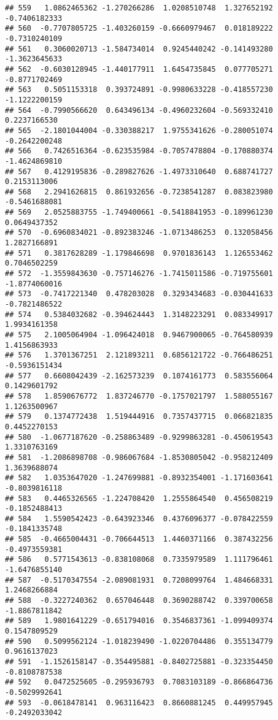 \documentclass[
]{article}
\begin{document}
\begin{verbatim}
## 559   1.0862465362 -1.270266286  1.0208510748  1.327652192 -0.7406182333
## 560  -0.7707805725 -1.403260159 -0.6660979467  0.018189222 -0.7310240109
## 561   0.3060020713 -1.584734014  0.9245440242 -0.141493280 -1.3623645633
## 562  -0.6030128945 -1.440177911  1.6454735845  0.077705271 -0.8771702469
## 563   0.5051153318  0.393724891 -0.9980633228 -0.418557230 -1.1222200159
## 564  -0.7990566620  0.643496134 -0.4960232604 -0.569332410  0.2237166530
## 565  -2.1801044004 -0.330388217  1.9755341626 -0.280051074 -0.2642200248
## 566   0.7426516364 -0.623535984 -0.7057478804 -0.170880374 -1.4624869810
## 567   0.4129195836 -0.289827626 -1.4973310640  0.688741727  0.2153113006
## 568   2.2941626815  0.861932656 -0.7238541287  0.083823980 -0.5461688081
## 569   2.0525883755 -1.749400661 -0.5418841953 -0.189961230  0.0649437352
## 570  -0.6960834021 -0.892383246 -1.0713486253  0.132058456  1.2827166891
## 571   0.3817628289 -1.179846698  0.9701836143  1.126553462  0.7046502259
## 572  -1.3559843630 -0.757146276 -1.7415011586 -0.719755601 -1.8774060016
## 573  -0.7417221340  0.478203028  0.3293434683 -0.030441633 -0.7821486522
## 574   0.5384032682 -0.394624443  1.3148223291  0.083349917  1.9934161358
## 575   2.1005064904 -1.096424018  0.9467900065 -0.764580939  1.4156863933
## 576   1.3701367251  2.121893211  0.6856121722 -0.766486251 -0.5936151434
## 577   0.6608042439 -2.162573239  0.1074161773  0.583556064  0.1429601792
## 578   1.8590676772  1.837246770 -0.1757021797  1.588055167  1.1263500967
## 579   0.1374772438  1.519444916  0.7357437715  0.066821835  0.4452270153
## 580  -1.0677187620 -0.258863489 -0.9299863281 -0.450619543  1.3310763169
## 581  -1.2086898708 -0.986067684 -1.8530805042 -0.958212409  1.3639688074
## 582   1.0353647020 -1.247699881 -0.8932354001 -1.171603641 -0.8039816118
## 583   0.4465326565 -1.224708420  1.2555864540  0.456508219 -0.1852488413
## 584   1.5590542423 -0.643923346  0.4376096377 -0.078422559 -0.1841335748
## 585  -0.4665004431 -0.706644513  1.4460371166  0.387432256 -0.4973559381
## 586   0.5771543613 -0.838108068  0.7335979589  1.111796461 -1.6476855140
## 587  -0.5170347554 -2.089081931  0.7208099764  1.484668331  1.2468266884
## 588  -0.3227240362  0.657046448  0.3690288742  0.339700658 -1.8867811842
## 589   1.9801641229 -0.651794016  0.3546837361 -1.099409374  0.1547809529
## 590   0.5099562124 -1.018239490 -1.0220704486  0.355134779  0.9616137023
## 591  -1.1526158147 -0.354495881 -0.8402725881 -0.323354450 -0.8108787538
## 592   0.0472525605 -0.295936793  0.7083103189 -0.866864736 -0.5029992641
## 593  -0.0618478141  0.963116423  0.8660881245  0.449957945 -0.2492033042

\end{verbatim}
\end{document}
